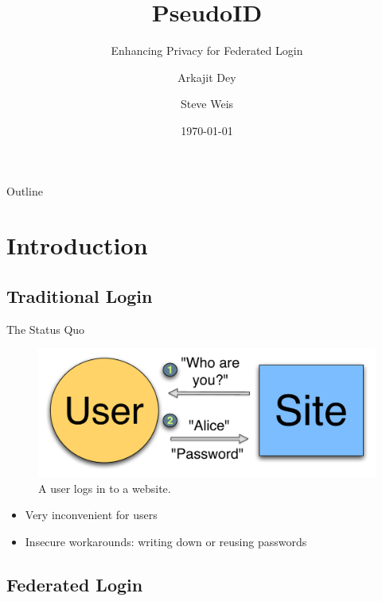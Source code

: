 \documentclass[handout]{beamer}
\title{PseudoID}
\subtitle{Enhancing Privacy for Federated Login}
\author{Arkajit Dey \and Steve Weis}
\date{\today}
\begin{document}
\frame{\titlepage}

\begin{frame}{Outline}
  \tableofcontents[pausesections]
\end{frame}

\section{Introduction}

\subsection{Traditional Login}

\begin{frame}{The Status Quo}

\begin{figure}
  \centering
  \includegraphics[scale=0.4]{figs/fig-passwd-color.pdf}
  \caption{A user logs in to a website.}
  \label{fig:passwd}
\end{figure}

\begin{itemize}
 \item<1-> Very inconvenient for users
 \item<2-> Insecure workarounds: writing down or reusing passwords
\end{itemize}

\end{frame}

\subsection{Federated Login}
\end{document}
